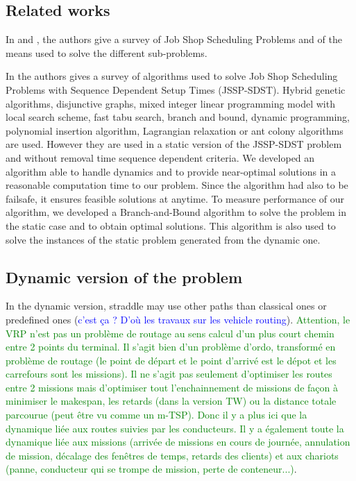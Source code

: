 \documentclass[a4paper,10pt]{article}
\begin{document}
\subsection{Related works}
  In \cite{Jain1999} and \cite{Brucker2010}, the authors give a survey of Job Shop Scheduling Problems and of the means used to solve the different sub-problems.
  
  In \cite{Allahverdi2008} the authors gives a survey of algorithms used to solve Job Shop Scheduling Problems with Sequence Dependent Setup Times (JSSP-SDST). Hybrid genetic algorithms, disjunctive graphs, mixed integer linear programming model with local search scheme, fast tabu search, branch and bound, dynamic programming, polynomial insertion algorithm, Lagrangian relaxation or ant colony algorithms are used. However they are used in a static version of the JSSP-SDST problem and without removal time sequence dependent criteria.
   We developed an algorithm able to handle dynamics and to provide near-optimal solutions in a reasonable computation time to our problem. Since the algorithm had also to be failsafe, it ensures feasible solutions at anytime. To measure performance of our algorithm, we developed a Branch-and-Bound algorithm to solve the problem in the static case and to obtain optimal solutions. This algorithm is also used to solve the instances of the static problem generated from the dynamic one.


\subsection{Dynamic version of the problem}


In the dynamic version, straddle may use other paths than classical ones or predefined ones (\textcolor{blue}{c'est ça ? D'où les travaux sur les vehicle routing}).
\textcolor{green}{Attention, le VRP n'est pas un problème de routage au sens calcul d'un plus court chemin entre 2 points du terminal. Il s'agit bien d'un problème d'ordo, transformé en problème de routage (le point de départ et le point d'arrivé est le dépot et les carrefours sont les missions). Il ne s'agit pas seulement d'optimiser les routes entre 2 missions mais d'optimiser tout l'enchainnement de missions de façon à minimiser le makespan, les retards (dans la version TW) ou la distance totale parcourue (peut être vu comme un m-TSP). Donc il y a plus ici que la dynamique liée aux routes suivies par les conducteurs. Il y a également toute la dynamique liée aux missions (arrivée de missions en cours de journée, annulation de mission, décalage des fenêtres de temps, retards des clients) et aux chariots (panne, conducteur qui se trompe de mission, perte de conteneur...)}.
\end{document}
